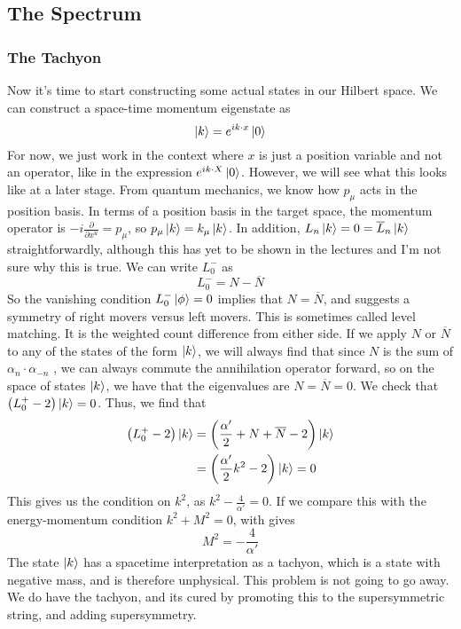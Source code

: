 \documentclass[11pt, oneside]{article}   	%
\theoremstyle{slanted}
\begin{document}
\subsection{The Spectrum}

\subsubsection{The Tachyon}
Now it's time to start constructing 
some actual states in our Hilbert space. 
We can construct a space-time momentum 
eigenstate as 
\[
\ket{ k }  = e ^{  i k \cdot  x } \ket{0} 
\] For now, we just work in the 
context where $ x $ is just a position variable 
and not an operator, like in the expression $ e^{ i k \cdot  X } \ket{ 0 } $. 
However, we will see what this looks like 
at a later stage. 
From quantum mechanics, we know 
how $ p_ \mu $ acts  in the position basis. In terms of a position basis in 
the target space, the 
momentum operator is $  -i \frac{\partial   }{\partial  x ^ u }  
 = p _ \mu $, so 
 $ p _ \mu \ket{ k }  = k _ \mu \ket{ k } $. 
 In addition, $ L _ n \ket{ k }  = 0  = \overline{ L } _ n \ket{ k } $
 straightforwardly, although this 
 has yet  to be shown in the lectures and I'm not sure why 
 this is true. 
 We can write $ L_0 ^ -  $ as 
 \[
 L_0 ^  -  = N - \overline{ N } 
 \] So the vanishing condition 
 $ L_0 ^  - \ket{ \phi }  = 0 $ implies
 that $ N  = \overline{ N }$, and  
 suggests a symmetry of 
 right movers versus left movers. 
 This is sometimes called level matching. 
 It is the weighted count difference from 
 either side. 
 If we apply $ N $ or $\overline{ N } $ 
 to any of the states of the form $ \ket{ k } $, 
 we will always find that since $ N $ is the sum 
 of $ \alpha _ n \cdot  \alpha _{ - n } $ , we 
 can always commute the annihilation operator forward, 
 so on the space of states $ \ket{ k } $, 
 we have that the eigenvalues are $ N  = \overline{ N }  = 0  $. 
 We check that $ \left( L _ 0 ^ +   -2  \right)  \ket{ k } =0   $. 
 Thus, we find that 
 \begin{align*}
	 \left( L_0 ^ +  - 2  \right)  \ket{ k} &=  
	 \left( \frac{\alpha  ' }{ 2 } + N + \overline{ N }  - 2  \right)  \ket{ k } \\
						&=  \left( 
						\frac{\alpha ' }{  2 }
					k ^ 2 - 2  \right)  \ket{ k } = 0 
 \end{align*} 
 This gives 
		us the condition on $ k ^ 2  $, as $ k ^ 2   - \frac{4}{\alpha ' }  = 0 $. 
		If we compare this with the energy-momentum condition 
		$ k ^ 2 + M ^ 2   =0  $, 
		with gives 
		\[
		 M ^ 2  =  - \frac{4}{\alpha ' } 
		\]
The state $ \ket{ k } $ has a spacetime interpretation as a tachyon, 
which is a state with negative mass, 
and is therefore unphysical. 
This problem is 
not going to go away. 
We do have the tachyon, and its 
cured by promoting this to the supersymmetric 
string, and adding supersymmetry. 
\end{document}
